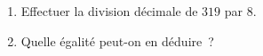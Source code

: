 \documentclass[exercice]{thedocument}%
\begin{document}
%
\begin{enumerate}
    \item Effectuer la division décimale de $319$ par $8$.
    \item Quelle égalité peut-on en déduire~?
\end{enumerate}
\end{document}
